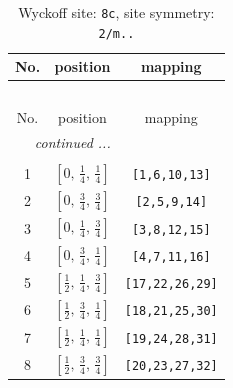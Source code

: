 \documentclass[fleqn,8pt]{jsarticle}
\begin{document}
\renewcommand{\arraystretch}{1.2}
\begin{longtable}{ccc}
\caption{Wyckoff site: {\tt 8c}, site symmetry: {\tt 2/m..}}
 \\
 \hline \hline
No. & position & mapping \\ \hline \endfirsthead

\multicolumn{2}{l}{\tablename\ \thetable{}} \\
 \hline \hline
No. & position & mapping \\ \hline \endhead

 \hline \hline
\multicolumn{2}{r}{\footnotesize\it continued ...} \\ \endfoot

 \hline \hline
\multicolumn{2}{r}{} \\ \endlastfoot

1 & $\left[ 0,\, \frac{1}{4},\, \frac{1}{4} \right]$ & {\tt [1,6,10,13]} \\ \hline
2 & $\left[ 0,\, \frac{3}{4},\, \frac{3}{4} \right]$ & {\tt [2,5,9,14]} \\ \hline
3 & $\left[ 0,\, \frac{1}{4},\, \frac{3}{4} \right]$ & {\tt [3,8,12,15]} \\ \hline
4 & $\left[ 0,\, \frac{3}{4},\, \frac{1}{4} \right]$ & {\tt [4,7,11,16]} \\ \hline
5 & $\left[ \frac{1}{2},\, \frac{1}{4},\, \frac{3}{4} \right]$ & {\tt [17,22,26,29]} \\ \hline
6 & $\left[ \frac{1}{2},\, \frac{3}{4},\, \frac{1}{4} \right]$ & {\tt [18,21,25,30]} \\ \hline
7 & $\left[ \frac{1}{2},\, \frac{1}{4},\, \frac{1}{4} \right]$ & {\tt [19,24,28,31]} \\ \hline
8 & $\left[ \frac{1}{2},\, \frac{3}{4},\, \frac{3}{4} \right]$ & {\tt [20,23,27,32]} \\
\end{longtable}
\renewcommand{\arraystretch}{1.2}
\end{document}
